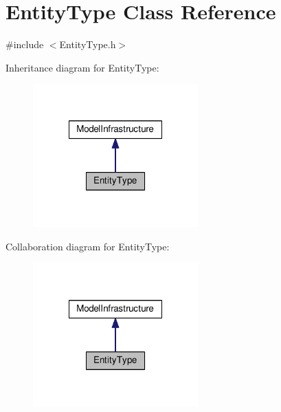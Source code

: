 \hypertarget{class_entity_type}{\section{Entity\-Type Class Reference}
\label{class_entity_type}
}


{\ttfamily \#include $<$Entity\-Type.\-h$>$}



Inheritance diagram for Entity\-Type\-:
\nopagebreak
\begin{figure}[H]
\begin{center}
\leavevmode
\includegraphics[width=180pt]{class_entity_type__inherit__graph}
\end{center}
\end{figure}


Collaboration diagram for Entity\-Type\-:
\nopagebreak
\begin{figure}[H]
\begin{center}
\leavevmode
\includegraphics[width=180pt]{class_entity_type__coll__graph}
\end{center}
\end{figure}
